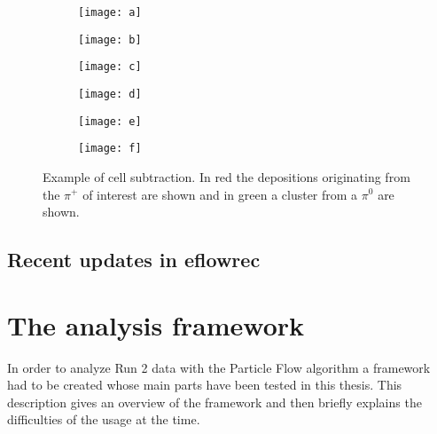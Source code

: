 \begin{figure}[htbp]
  \centering
  \begin{subfigure}[b]{0.3\figwidth}
    \texttt{[image: a]}
    \caption{}\label{fig:sub-a}
  \end{subfigure}
  \begin{subfigure}[b]{0.3\figwidth}
    \texttt{[image: b]}
    \caption{}\label{fig:sub-b}
  \end{subfigure}
  \begin{subfigure}[b]{0.3\figwidth}
    \texttt{[image: c]}
    \caption{}\label{fig:sub-c}
  \end{subfigure}
  \begin{subfigure}[b]{0.3\figwidth}
    \texttt{[image: d]}
    \caption{}\label{fig:sub-d}
  \end{subfigure}
    
    
  \begin{subfigure}[b]{0.3\figwidth}
        \texttt{[image: e]}
        \caption{}\label{fig:sub-e}
  \end{subfigure}
  \begin{subfigure}[b]{0.3\figwidth}
        \texttt{[image: f]}
        \caption{}\label{fig:sub-f}
  \end{subfigure}
  \caption{Example of cell subtraction. In red the depositions originating from the $\pi ^+$ of interest are shown and in green a cluster from a $\pi ^0$ are shown. \cite{pflow16}}
  \label{fig:sub}
\end{figure}


\subsection{Recent updates in eflowrec}


\section{The analysis framework}

In order to analyze Run 2 data with the Particle Flow algorithm a framework had to be created whose main parts have been tested in this thesis. This description gives an overview of the framework and then briefly explains the difficulties of the usage at the time.

